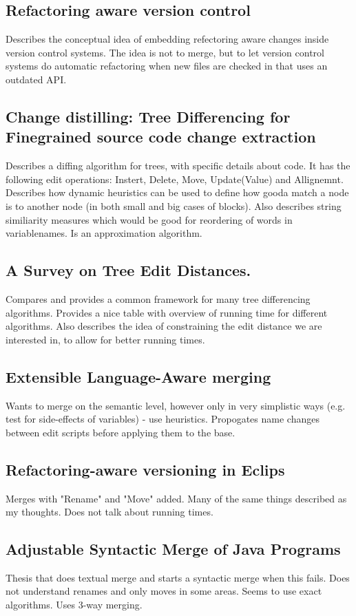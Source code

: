 \documentclass[12pt]{article}
\begin{document}
\subsection{Refactoring aware version control}
Describes the conceptual idea of embedding refectoring aware changes inside version control systems. The idea is not to merge, but to let version control systems do automatic refactoring when new files are checked in that uses an outdated API. 

\subsection{Change distilling: Tree Differencing for Finegrained source code change extraction}
Describes a diffing algorithm for trees, with specific details about code. It has the following edit operations: Instert, Delete, Move, Update(Value) and Allignemnt. Describes how dynamic heuristics can be used to define how gooda match a node is to another node (in both small and big cases of blocks). Also describes string similiarity measures which would be good for reordering of words in variablenames. Is an approximation algorithm.

\subsection{A Survey on Tree Edit Distances.}
Compares and provides a common framework for many tree differencing algorithms. Provides a nice table with overview of running time for different algorithms. Also describes the idea of constraining the edit distance we are interested in, to allow for better running times.

\subsection{Extensible Language-Aware merging}
Wants to merge on the semantic level, however only in very simplistic ways (e.g. test for side-effects of variables) - use heuristics. Propogates name changes between edit scripts before applying them to the base.

\subsection{Refactoring-aware versioning in Eclips}
Merges with "Rename" and "Move" added. Many of the same things described as my thoughts. Does not talk about running times.

\subsection{Adjustable Syntactic Merge of Java Programs}
Thesis that does textual merge and starts a syntactic merge when this fails. Does not understand renames and only moves in some areas. Seems to use exact algorithms. Uses 3-way merging.
\end{document}

